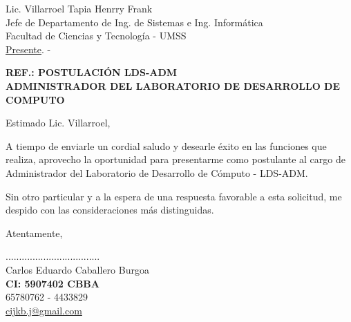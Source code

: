 \documentclass[letterpaper,12pt]{letter}
\begin{document}
\date{3 de julio de 2012}
\begin{letter}{Lic. Villarroel Tapia Henrry Frank \\ Jefe de Departamento de Ing. de Sistemas e Ing. Inform\'atica\\ Facultad de Ciencias y Tecnolog\'ia - UMSS \\ \underline {Presente}. -}

\begin{center}
	\opening{\textbf{REF.: POSTULACI\'ON LDS-ADM \\ ADMINISTRADOR DEL LABORATORIO DE DESARROLLO DE COMPUTO}}
\end{center}

Estimado Lic. Villarroel,

A tiempo de enviarle un cordial saludo y desearle éxito en las funciones que realiza, 
aprovecho la oportunidad para presentarme como postulante al cargo de Administrador del Laboratorio de Desarrollo
de C\'omputo - LDS-ADM.

Sin otro particular y a la espera de una respuesta favorable a esta solicitud, me despido con las consideraciones más distinguidas.

Atentamente,

\vspace{3cm}

\begin{center}
...................................\\
Carlos Eduardo Caballero Burgoa\\
{\bfseries CI: 5907402 CBBA} \\
65780762 - 4433829 \\
\url {cijkb.j@gmail.com}
\end{center}
\end{letter}
\end{document}
